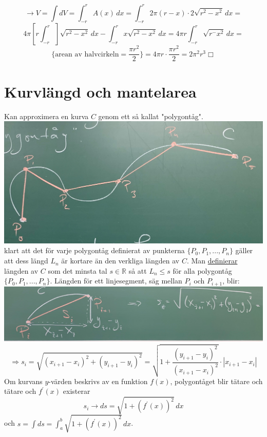 \begin{equation*}
    \rightarrow V=\int dV=\int_{-r}^r A(x)\, dx=
    \int_{-r}^r2\pi(r-x)\cdot 2\sqrt{r^2-x^2}\, dx=
\end{equation*}
\begin{equation*}
    4\pi[r\int_{-r}^r]\sqrt{r^2-x^2}\, dx - \int_{-r}^r x\sqrt{r^2-x^2}\, dx=
    4\pi r\int_{-r}^r\sqrt{r^-x^2}\, dx=
\end{equation*}
\begin{equation*}
    \{\text{arean av halvcirkeln}=\frac{\pi r^2}{2}\}=
    4\pi r\cdot\frac{\pi r^2}{2}=
    2\pi^2r^3 \Box
\end{equation*}

\section{Kurvlängd och mantelarea}
Kan approximera en kurva $C$ genom ett så kallat "polygontåg".\\
\includegraphics[scale=0.1]{lessons/lesson19/imgs/img09.jpg}
klart att det för varje polygontåg definierat av punkterna $\{P_0,P_1,...,P_n\}$ gäller att dess längd $L_n$ är kortare än den verkliga längden av $C$.
Man \underline{definierar} längden av $C$ som det minsta tal $s\in\mathbb{R}$ så att $L_n\leq s$ för alla polygontåg $\{P_0,P_1,...,P_n\}$.
Längden för ett linjesegment, säg mellan $P_i$ och $P_{i+1}$, blir:
\includegraphics[scale=0.1]{lessons/lesson19/imgs/img10.jpg}
\begin{equation*}
    \Rightarrow s_i=
    \sqrt{(x_{i+1}-x_i)^2+(y_{i+1}-y_i)^2}=
    \sqrt{1+\frac{(y_{i+1}-y_i)^2}{(x_{i+1}-x_i)^2}}\cdot |x_{i+1}-x_i|
\end{equation*}
Om kurvans $y$-värden beskrivs av en funktion $f(x)$, polygontåget blir tätare och tätare och $f^\prime(x)$ existerar
\begin{equation*}
    s_i\to ds=\sqrt{1+(f^\prime(x))^2}\, dx
\end{equation*}
och $s=\int ds=\int_a^b\sqrt{1+(f^\prime(x))^2}\, dx$.

